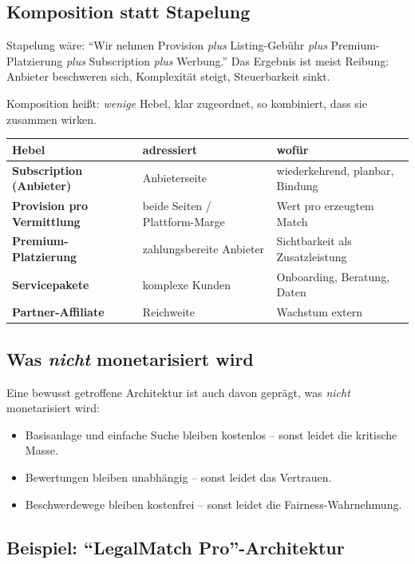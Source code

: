 \documentclass[11pt,a4paper,oneside]{article}
\begin{document}
\subsection{Komposition statt Stapelung}

Stapelung wäre: ``Wir nehmen Provision \emph{plus} Listing-Gebühr \emph{plus} Premium-Platzierung \emph{plus} Subscription \emph{plus} Werbung.'' Das Ergebnis ist meist Reibung: Anbieter beschweren sich, Komplexität steigt, Steuerbarkeit sinkt.

Komposition heißt: \emph{wenige} Hebel, klar zugeordnet, so kombiniert, dass sie zusammen wirken.

\begin{tabularx}{\linewidth}{@{}>{\bfseries}lXX@{}}
\toprule
Hebel & adressiert & wofür \\
\midrule
Subscription (Anbieter) & Anbieterseite & wiederkehrend, planbar, Bindung \\
Provision pro Vermittlung & beide Seiten / Plattform-Marge & Wert pro erzeugtem Match \\
Premium-Platzierung & zahlungsbereite Anbieter & Sichtbarkeit als Zusatzleistung \\
Servicepakete & komplexe Kunden & Onboarding, Beratung, Daten \\
Partner-Affiliate & Reichweite & Wachstum extern \\
\bottomrule
\end{tabularx}

\subsection{Was \emph{nicht} monetarisiert wird}

Eine bewusst getroffene Architektur ist auch davon geprägt, was \emph{nicht} monetarisiert wird:

\begin{itemize}
  \item Basisanlage und einfache Suche bleiben kostenlos -- sonst leidet die kritische Masse.
  \item Bewertungen bleiben unabhängig -- sonst leidet das Vertrauen.
  \item Beschwerdewege bleiben kostenfrei -- sonst leidet die Fairness-Wahrnehmung.
\end{itemize}

\subsection{Beispiel: ``LegalMatch Pro''-Architektur}
\end{document}
